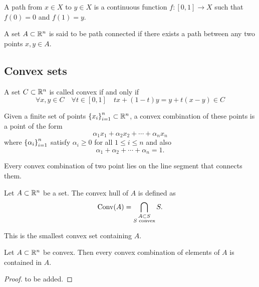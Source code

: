 \documentclass[11pt,a4paper]{article}
\begin{document}
\begin{definition}[Path]
  A path from $x \in X$ to $y \in X$ is a continuous function 
  $f \colon [0,1] \to X$ such that $f(0) = 0$ and $f(1) = y$.
\end{definition}

\begin{definition}
  A set $A \subset \mathbb{R}^n$ is said to be path connected if there exists a path
  between any two points $x,y \in A$.
\end{definition}

\subsection{Convex sets}

\begin{definition}
  A set $C \subset \mathbb{R}^n$ is called convex if and only if
  \[
    \forall x,y \in C \quad \forall t \in [0,1] \quad
    tx + (1-t)y = y + t(x-y) \in C
  \]
\end{definition}

\begin{definition}
  Given a finite set of points $\left\{x_i\right\}_{i=1}^{n} \subset \mathbb{R}^n$,
  a convex combination of these points is a point of the form
  \[
    \alpha_1 x_1 + \alpha_2 x_2 + \cdots + \alpha_n x_n
  \]
  where $\left\{\alpha_i\right\}_{i=1}^{n}$ satisfy $\alpha_i \geq 0$ for all
  $1 \le i \le n$ and also
  \[
    \alpha_1 + \alpha_2 + \cdots + \alpha_n = 1.
  \]
\end{definition}
\begin{remark}
  Every convex combination of two point lies on the line segment that
  connects them.
\end{remark}

\begin{definition}
  Let $A \subset \mathbb{R}^n$ be a set.
  The convex hull of $A$ is defined as
  \[
    \operatorname{Conv}(A) = \bigcap_{\substack{A \subset S \\ S \text{ convex}}} S.
  \]
\end{definition}
\begin{remark}
  This is the smallest convex set containing $A$.
\end{remark}

\begin{proposition}
  Let $A \subset \mathbb{R}^n$ be convex.
  Then every convex combination of elements of $A$ is contained in $A$.
\end{proposition}
\begin{proof}
  to be added.
\end{proof}
\end{document}
